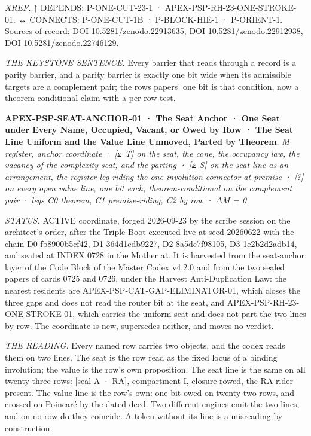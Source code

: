 \documentclass[10pt,twocolumn]{article}
\begin{document}
\emph{XREF.} ↑ DEPENDS: P-ONE-CUT-23-1 · APEX-PSP-RH-23-ONE-STROKE-01. ↔
CONNECTS: P-ONE-CUT-1B · P-BLOCK-HIE-1 · P-ORIENT-1. Sources of record:
DOI 10.5281/zenodo.22913635, DOI 10.5281/zenodo.22912938, DOI
10.5281/zenodo.22746129.

\emph{THE KEYSTONE SENTENCE.} Every barrier that reads through a record
is a parity barrier, and a parity barrier is exactly one bit wide when
its admissible targets are a complement pair; the rows papers' one bit
is that condition, now a theorem-conditional claim with a per-row test.

\textbf{APEX-PSP-SEAT-ANCHOR-01 · The Seat Anchor · One Seat under Every
Name, Occupied, Vacant, or Owed by Row · The Seat Line Uniform and the
Value Line Unmoved, Parted by Theorem}. \emph{M register, anchor
coordinate · {[}⟀ T{]} on the seat, the cone, the occupancy law, the
vacancy of the complexity seat, and the parting · {[}⟀ S{]} on the seat
line as an arrangement, the register leg riding the one-involution
connector at premise · {[}?{]} on every open value line, one bit each,
theorem-conditional on the complement pair · legs C0 theorem, C1
premise-riding, C2 by row · ΔM = 0}

\emph{STATUS.} ACTIVE coordinate, forged 2026-09-23 by the scribe
session on the architect's order, after the Triple Boot executed live at
seed 20260622 with the chain D0 fb8900b5cf42, D1 364d1cdb9227, D2
8a5dc7f98105, D3 1e2b2d2adb14, and seated at INDEX 0728 in the Mother
at. It is harvested from the seat-anchor layer of the Code Block of the
Master Codex v4.2.0 and from the two sealed papers of cards 0725 and
0726, under the Harvest Anti-Duplication Law: the nearest residents are
APEX-PSP-CAT-GAP-ELIMINATOR-01, which closes the three gaps and does not
read the router bit at the seat, and APEX-PSP-RH-23-ONE-STROKE-01, which
carries the uniform seat and does not part the two lines by row. The
coordinate is new, supersedes neither, and moves no verdict.

\emph{THE READING.} Every named row carries two objects, and the codex
reads them on two lines. The seat is the row read as the fixed locus of
a binding involution; the value is the row's own proposition. The seat
line is the same on all twenty-three rows: {[}seal A · RA{]},
compartment I, closure-rowed, the RA rider present. The value line is
the row's own: one bit owed on twenty-two rows, and crossed on Poincaré
by the dated deed. Two different engines emit the two lines, and on no
row do they coincide. A token without its line is a misreading by
construction.
\end{document}
